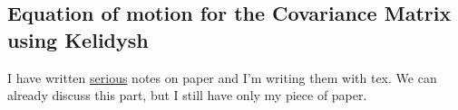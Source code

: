 \documentclass[a4paper,11pt]{article}
\DeclareMathOperator{\Tr}{Tr}
\theoremstyle{remark}
\newcommand{\mean}[1]{\ensuremath{\langle #1 \rangle}}
\newcommand{\ubar}[1]{\underline{#1}}
\newcommand*{\mathcolor}{}  %
\def\mathcolor#1#{\mathcoloraux{#1}}
\newcommand*{\mathcoloraux}[3]{%
  \protect\leavevmode
  \begingroup
    \color#1{#2}#3%
  \endgroup
}
\begin{document}
  \subsection{Equation of motion for the Covariance Matrix using Kelidysh}
  I have written \ubar{serious} notes on paper and I'm writing them with tex. We can already discuss this part, but I still have only my piece of paper.
\end{document}
